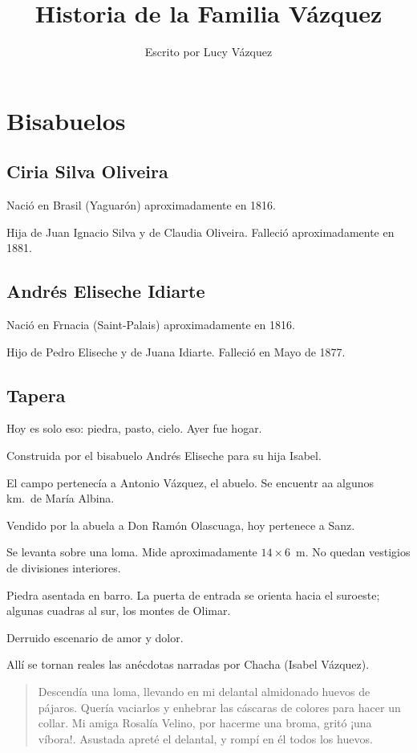 \documentclass{article}
\title{Historia de la Familia Vázquez}
\author{Escrito por Lucy Vázquez}
\begin{document}
\maketitle
\tableofcontents

\section{Bisabuelos}

\subsection{Ciria Silva Oliveira}

Nació en Brasil (Yaguarón) aproximadamente en 1816.

Hija de Juan Ignacio Silva y de Claudia Oliveira. Falleció aproximadamente en 1881.

\subsection{Andrés Eliseche Idiarte}

Nació en Frnacia (Saint-Palais) aproximadamente en 1816.

Hijo de Pedro Eliseche y de Juana Idiarte. Falleció en Mayo de 1877.

\subsection{Tapera}

Hoy es solo eso: piedra, pasto, cielo. Ayer fue hogar.

Construida por el bisabuelo Andrés Eliseche para su hija Isabel.

El campo pertenecía a Antonio Vázquez, el abuelo. Se encuentr aa algunos km.\ de María Albina.

Vendido por la abuela a Don Ramón Olascuaga, hoy pertenece a Sanz.

Se levanta sobre una loma. Mide aproximadamente $14\times6$~m. No quedan vestigios de divisiones interiores.

Piedra asentada en barro. La puerta de entrada se orienta hacia el suroeste; algunas cuadras al sur, los montes de Olimar.

Derruido escenario de amor y dolor.

Allí se tornan reales las anécdotas narradas por Chacha (Isabel Vázquez).

\begin{quote}
    Descendía una loma, llevando en mi delantal almidonado huevos de pájaros. Quería vaciarlos y enhebrar las cáscaras de colores para hacer un collar. Mi amiga Rosalía Velino, por hacerme una broma, gritó ¡una víbora!. Asustada apreté el delantal, y rompí en él todos los huevos.
\end{quote}
\end{document}
